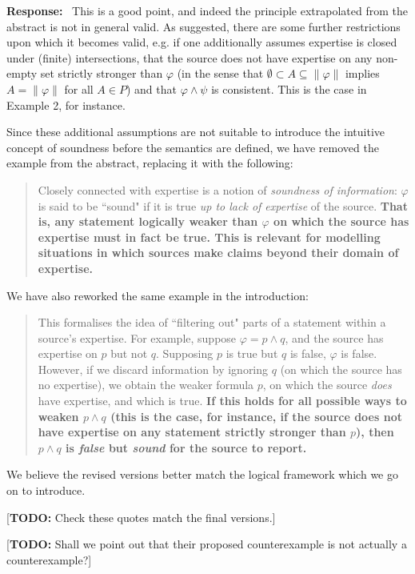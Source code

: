 \documentclass[12pt]{article}
\newcommand\todo[1]{{\color{red} [\textbf{TODO:} {#1}]}}
\newenvironment{response}{
    \noindent\textbf{Response:}\
}{\vspace{5mm}}
\renewcommand{\phi}{\varphi}
\begin{document}
\begin{response}
    This is a good point, and indeed the principle extrapolated from the
    abstract is not in general valid. As suggested, there are some further
    restrictions upon which it becomes valid, e.g. if one additionally assumes
    expertise is closed under (finite) intersections, that the source does not
    have expertise on any non-empty set strictly stronger than $\phi$ (in the
    sense that $\emptyset \subset A \subseteq \|\phi\|$ implies $A = \|\phi\|$
    for all $A \in P$) and that $\phi \land \psi$ is consistent. This is the
    case in Example 2, for instance.

    Since these additional assumptions are not suitable to introduce the
    intuitive concept of soundness before the semantics are defined, we have
    removed the example from the abstract, replacing it with the following:

    \begin{quotation}
        Closely connected with expertise is a notion of \emph{soundness of
        information}: $\phi$ is said to be ``sound" if it is true \emph{up to
        lack of expertise} of the source. \textbf{That is, any statement
        logically weaker than $\phi$ on which the source has expertise must in
        fact be true. This is relevant for modelling situations in which
        sources make claims beyond their domain of expertise.}
    \end{quotation}

    We have also reworked the same example in the introduction:

    \begin{quotation}
        This formalises the idea of ``filtering out" parts of a statement
        within a source's expertise. For example, suppose $\phi = p \land q$,
        and the source has expertise on $p$ but not $q$. Supposing $p$ is true
        but $q$ is false, $\phi$ is false. However, if we discard information
        by ignoring $q$ (on which the source has no expertise), we obtain the
        weaker formula $p$, on which the source \emph{does} have expertise, and
        which is true. \textbf{If this holds for all possible ways to weaken $p
        \land q$ (this is the case, for instance, if the source does not have
        expertise on any statement strictly stronger than $p$), then $p \land
        q$ is \emph{false} but \emph{sound} for the source to report.}
    \end{quotation}

    We believe the revised versions better match the logical framework which we
    go on to introduce.

    \todo{Check these quotes match the final versions.}

    \todo{Shall we point out that their proposed counterexample is not actually
    a counterexample?}
\end{response}
\end{document}
